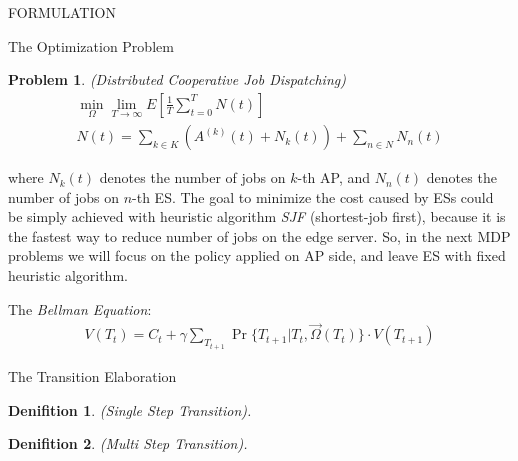 \documentclass[10pt, conference, letterpaper]{IEEEtran}
\newtheorem{definition}{Denifition}
\newtheorem{problem}{Problem}
\begin{document}
\begin{section}{FORMULATION}
\begin{subsection}{The Optimization Problem}
            \begin{problem}
                (Distributed Cooperative Job Dispatching)
                \begin{gather}
                    \min_{\Omega} \lim_{T \to \infty} E[\frac{1}{T} \sum_{t=0}^{T} N(t)]
                    \nonumber\\
                    N(t) = \sum_{k \in K} (A^{(k)}(t) + N_k(t))
                            + \sum_{n \in N} N_n(t)
                \end{gather}
            \end{problem}
            where $N_k(t)$ denotes the number of jobs on $k$-th AP, and $N_n(t)$ denotes the number of jobs on $n$-th ES.
            The goal to minimize the cost caused by ESs could be simply achieved with heuristic algorithm \emph{SJF} (shortest-job first), because it is the fastest way to reduce number of jobs on the edge server. So, in the next MDP problems we will focus on the policy applied on AP side, and leave ES with fixed heuristic algorithm.

            The \emph{Bellman Equation}:
            \begin{align}
                V(T_{t}) = C_t + \gamma \sum_{T_{t+1}} \Pr\{T_{t+1}|T_{t}, \vec{\Omega}(T_t)\} \cdot V(T_{t+1})
            \end{align}
        \end{subsection}

        \begin{subsection}{The Transition Elaboration}
            \begin{definition}
                (Single Step Transition).

            \end{definition}

            \begin{definition}
                (Multi Step Transition).
            \end{definition}
        \end{subsection}
        
    \end{section}
\end{document}
